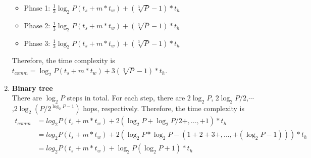 \documentclass[10pt,letterpaper]{article}
\begin{document}
\begin{enumerate}
\begin{itemize}
\item Phase 1: $\frac{1}{3}\log_2P(t_s + m*t_w)+(\sqrt[3]{P} - 1)*t_h$
\item Phase 2: $\frac{1}{3}\log_2P(t_s + m*t_w)+(\sqrt[3]{P} - 1)*t_h$
\item Phase 3: $\frac{1}{3}\log_2P(t_s + m*t_w)+(\sqrt[3]{P} - 1)*t_h$
\end{itemize}
Therefore, the time complexity is $t_{comm} = \log_2P(t_s + m*t_w)+3(\sqrt[3]{P} - 1)*t_h$.
\item \textbf{Binary tree}\\[10pt]
There are $\log_2P$ steps in total. For each step, there are $2\log_2P$, $2\log_2P/2$,$\cdots$,$2\log_2(P/2^{\log_2P-1})$ hops, respectively. Therefore, the time complexity is
\begin{align*}
t_{comm} &= log_2P(t_s+m*t_w)+2(\log_2P+\log_2P/2+,...,+1)*t_h\\
&= log_2P(t_s+m*t_w)+ 2(\log_2P*\log_2P - (1+2+3+,...,+(\log_2P-1)))*t_h\\
&= log_2P(t_s+m*t_w) + \log_2P(\log_2P+1)*t_h
\end{align*}
\end{enumerate}
\end{document}
